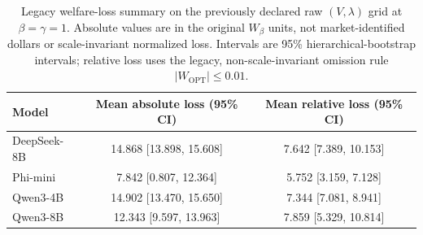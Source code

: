 \begin{table}[H]
\centering
\caption{Legacy welfare-loss summary on the previously declared raw $(V,\lambda)$ grid at $\beta=\gamma=1$. Absolute values are in the original $W_\beta$ units, not market-identified dollars or scale-invariant normalized loss. Intervals are 95\% hierarchical-bootstrap intervals; relative loss uses the legacy, non-scale-invariant omission rule $|W_{\mathrm{OPT}}|\leq0.01$.}
\label{tab:welfareuncertainty}
\small
\setlength{\tabcolsep}{3.5pt}
\begin{tabular}{lcc}
\toprule
Model & Mean absolute loss (95\% CI) & Mean relative loss (95\% CI) \\
\midrule
DeepSeek-8B & 14.868 [13.898, 15.608] & 7.642 [7.389, 10.153] \\
Phi-mini & 7.842 [0.807, 12.364] & 5.752 [3.159, 7.128] \\
Qwen3-4B & 14.902 [13.470, 15.650] & 7.344 [7.081, 8.941] \\
Qwen3-8B & 12.343 [9.597, 13.963] & 7.859 [5.329, 10.814] \\
\bottomrule
\end{tabular}
\end{table}

